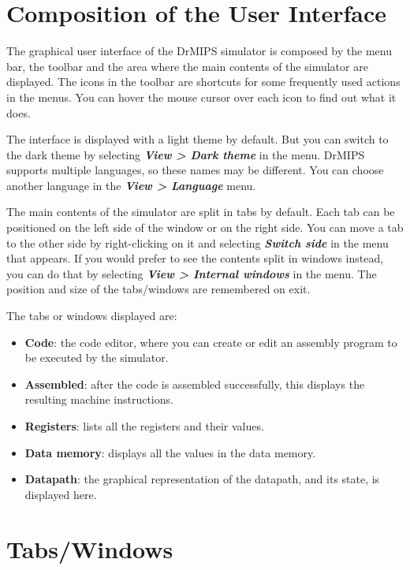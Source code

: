 \documentclass[11pt,a4paper,twoside,titlepage]{article}
\author{Bruno Nova}
\title{\Title}
\newcommand{\menupath}[1]{\textbf{\emph{#1}}}
\begin{document}
\maketitle
\tableofcontents
\newpage


\section{Composition of the User Interface}

The graphical user interface of the DrMIPS simulator is composed by the menu 
bar, the toolbar and the area where the main contents of the simulator 
are displayed.
The icons in the toolbar are shortcuts for some frequently used actions in the
menus. You can hover the mouse cursor over each icon to find out what it does.

The interface is displayed with a light theme by default. But you can switch
to the dark theme by selecting \menupath{View > Dark theme} in the menu.
DrMIPS supports multiple languages, so these names may be different.
You can choose another language in the \menupath{View > Language} menu.

The main contents of the simulator are split in tabs by default. Each tab can
be positioned on the left side of the window or on the right side. 
You can move a tab to the other side by right-clicking on it and selecting 
\menupath{Switch side} in the menu that appears.
If you would prefer to see the contents split in windows instead, you can do
that by selecting \menupath{View > Internal windows} in the menu.
The position and size of the tabs/windows are remembered on exit.

The tabs or windows displayed are:
\begin{itemize}
	\item \textbf{Code}: the code editor, where you can create or edit an
		assembly program to be executed by the simulator.
	\item \textbf{Assembled}: after the code is assembled successfully, this
		displays the resulting machine instructions.
	\item \textbf{Registers}: lists all the registers and their values.
	\item \textbf{Data memory}: displays all the values in the data memory.
	\item \textbf{Datapath}: the graphical representation of the datapath,
		and its state, is displayed here.
\end{itemize}


\section{Tabs/Windows}
\end{document}
